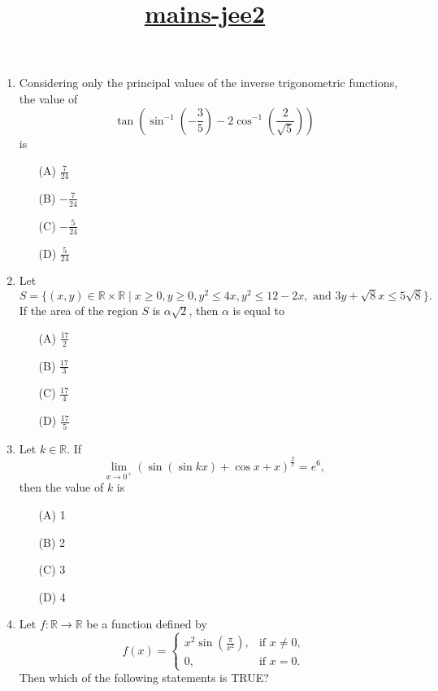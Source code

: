 \documentclass[12pt,a4paper]{article}
\title{\underline{\textbf{mains-jee2}}}
\date{}
\begin{document}
\maketitle
\begin{enumerate}
  \item Considering only the principal values of the inverse trigonometric functions, the value of  
\[
    \tan \left( \sin^{-1} \left( -\frac{3}{5} \right) - 2\cos^{-1} \left( \frac{2}{\sqrt{5}} \right) \right)
\]
    is  
    \begin{itemize}
        \item[(A)] $\frac{7}{24}$
        \item[(B)] $-\frac{7}{24}$
        \item[(C)] $-\frac{5}{24}$
        \item[(D)] $\frac{5}{24}$
    \end{itemize}
		\item Let  
\[
    S = \{(x,y) \in \mathbb{R} \times \mathbb{R} \mid x \geq 0, y \geq 0, y^2 \leq 4x, y^2 \leq 12 - 2x, \text{ and } 3y + \sqrt{8}x \leq 5\sqrt{8} \}.
\]
    If the area of the region $ S $ is $ \alpha \sqrt{2} $, then $ \alpha $ is equal to  
    \begin{itemize}
        \item[(A)] $\frac{17}{2}$
        \item[(B)] $\frac{17}{3}$
        \item[(C)] $\frac{17}{4}$
        \item[(D)] $\frac{17}{5}$
    \end{itemize}
    \item Let $ k \in \mathbb{R} $. If  
\[
    \lim_{x \to 0^+} \left( \sin(\sin kx) + \cos x + x \right)^{\frac{2}{x}} = e^6,
\]
    then the value of $ k $ is  
    \begin{itemize}
        \item[(A)] 1
        \item[(B)] 2
        \item[(C)] 3
        \item[(D)] 4
    \end{itemize}
    \item Let $ f : \mathbb{R} \to \mathbb{R} $ be a function defined by  
\[
    f(x) =
    \begin{cases} 
        x^2 \sin \left( \frac{\pi}{x^2} \right), & \text{if } x \neq 0, \\
        0, & \text{if } x = 0.
    \end{cases}
\]
    Then which of the following statements is TRUE?  

\end{enumerate}
\end{document}
